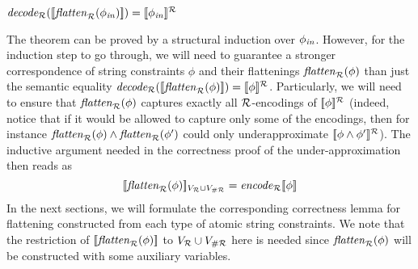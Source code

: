 \documentclass[sigplan,review,anonymous]{acmart}\settopmatter{printfolios=true,printccs=false,printacmref=false}
\begin{document}
\begin{theorem}\label{theorem:correct}
$\mathit{decode_{\mathcal{R}}} ([\![\mathit{flatten}_{\mathcal{R}}(\phi_{\mathit{in}})]\!]) = [\![\phi_{\mathit{in}}]\!]^{\mathcal{R}}$ 
\end{theorem}

The theorem can be proved by a structural induction over $\phi_{\mathit{in}}$.
However, for the induction step to go through, we will need to guarantee a stronger correspondence of string constraints $\phi$ and their flattenings $\mathit{flatten}_{\mathcal{R}}(\phi)$ than just the semantic equality $\mathit{decode_{\mathcal{R}}} ([\![\mathit{flatten}_{\mathcal{R}}(\phi)]\!]) = [\![\phi]\!]^{\mathcal{R}}$.  
Particularly, we will need to
 ensure that $\mathit{flatten}_{\mathcal{R}}(\phi)$ captures exactly all $\mathcal{R}$-encodings of $[\![\phi]\!]^{\mathcal{R}}$
(indeed, notice that if it would be allowed to capture only some of the encodings, then for instance $\mathit{flatten}_{\mathcal{R}}(\phi) \land \mathit{flatten}_{\mathcal{R}}(\phi')$ could only underapproximate $[\![\phi\land\phi']\!]^{\mathcal{R}}$).
%
%
%
%
The inductive argument needed in the correctness proof of the under-approximation then reads as
$$[\![\mathit{flatten}_{\mathcal{R}}(\phi)]\!]_{V_{\mathcal{R}}\cup V_{\#\mathcal{R}}}  = \mathit{encode}_{\mathcal{R}}{[\![\phi]\!]}$$ 
%
In the next sections, 
we will formulate the corresponding correctness lemma for flattening constructed from each type of atomic string constraints.
%
We note that the restriction of $[\![\mathit{flatten}_{\mathcal{R}}(\phi)]\!]$ to $V_{\mathcal{R}}\cup V_{\#\mathcal{R}}$ here is needed since $\mathit{flatten}_{\mathcal{R}}(\phi)$ will be constructed with some auxiliary variables. 
\end{document}

